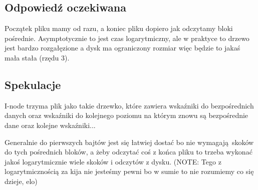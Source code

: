 \subsection{Odpowiedź oczekiwana}
Początek pliku mamy od razu, a koniec pliku dopiero jak odczytamy bloki pośrednie.
Asymptotycznie to jest czas logarytmiczny, ale w praktyce to drzewo jest bardzo rozgałęzione a dysk ma ograniczony rozmiar więc będzie to jakaś mała stała (rzędu 3).

\subsection{Spekulacje}
I-node trzyma plik jako takie drzewko, które zawiera wskaźniki do bezpośrednich danych  oraz wskaźniki do kolejnego poziomu na którym znowu są bezpośrednie dane oraz kolejne wskaźniki...

Generalnie do pierwszych bajtów jest się łatwiej dostać bo nie wymagają skoków do tych pośrednich bloków,
 a żeby odczytać coś z końca pliku to trzeba wykonać jakoś logarytmicznie wiele skoków i odczytów z dysku. (NOTE: Tego z logarytmicznością za kija nie jesteśmy pewni bo w sumie to nie rozumiemy co się dzieje, elo)